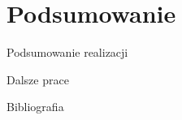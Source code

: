 \documentclass[aspectratio=1610,polish]{beamer} %
\begin{document}
  \section{Podsumowanie}
  \begin{frame}{Podsumowanie realizacji}

  \end{frame}
  \begin{frame}{Dalsze prace}

  \end{frame}
  \begin{frame}[allowframebreaks]{Bibliografia}
    \nocite{*}
    \printbibliography
  \end{frame}
\end{document}
